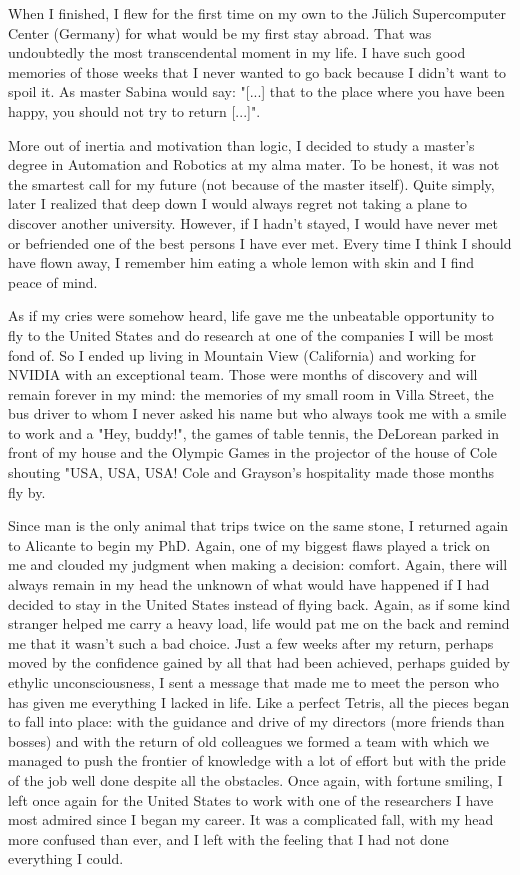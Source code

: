 When I finished, I flew for the first time on my own to the Jülich Supercomputer Center (Germany) for what would be my first stay abroad. That was undoubtedly the most transcendental moment in my life. I have such good memories of those weeks that I never wanted to go back because I didn't want to spoil it. As master Sabina would say: "[...] that to the place where you have been happy, you should not try to return [...]".

More out of inertia and motivation than logic, I decided to study a master's degree in Automation and Robotics at my alma mater. To be honest, it was not the smartest call for my future (not because of the master itself). Quite simply, later I realized that deep down I would always regret not taking a plane to discover another university. However, if I hadn't stayed, I would have never met or befriended one of the best persons I have ever met. Every time I think I should have flown away, I remember him eating a whole lemon with skin and I find peace of mind.

As if my cries were somehow heard, life gave me the unbeatable opportunity to fly to the United States and do research at one of the companies I will be most fond of. So I ended up living in Mountain View (California) and working for NVIDIA with an exceptional team. Those were months of discovery and will remain forever in my mind: the memories of my small room in Villa Street, the bus driver to whom I never asked his name but who always took me with a smile to work and a "Hey, buddy!", the games of table tennis, the DeLorean parked in front of my house and the Olympic Games in the projector of the house of Cole shouting "USA, USA, USA! Cole and Grayson's hospitality made those months fly by.

Since man is the only animal that trips twice on the same stone, I returned again to Alicante to begin my PhD. Again, one of my biggest flaws played a trick on me and clouded my judgment when making a decision: comfort. Again, there will always remain in my head the unknown of what would have happened if I had decided to stay in the United States instead of flying back. Again, as if some kind stranger helped me carry a heavy load, life would pat me on the back and remind me that it wasn't such a bad choice. Just a few weeks after my return, perhaps moved by the confidence gained by all that had been achieved, perhaps guided by ethylic unconsciousness, I sent a message that made me to meet the person who has given me everything I lacked in life. Like a perfect Tetris, all the pieces began to fall into place: with the guidance and drive of my directors (more friends than bosses) and with the return of old colleagues we formed a team with which we managed to push the frontier of knowledge with a lot of effort but with the pride of the job well done despite all the obstacles. Once again, with fortune smiling, I left once again for the United States to work with one of the researchers I have most admired since I began my career. It was a complicated fall, with my head more confused than ever, and I left with the feeling that I had not done everything I could.

